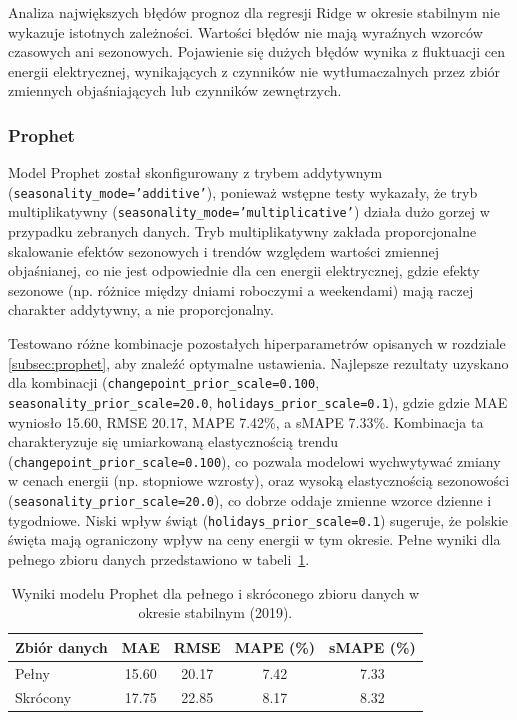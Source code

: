 Analiza największych błędów prognoz dla regresji Ridge w okresie stabilnym nie wykazuje istotnych zależności. Wartości błędów nie mają wyraźnych wzorców czasowych ani sezonowych. Pojawienie się dużych błędów wynika z fluktuacji cen energii elektrycznej, wynikających z czynników nie wytłumaczalnych przez zbiór zmiennych objaśniających lub czynników zewnętrzych.

\subsubsection{Prophet}
Model Prophet został skonfigurowany z trybem addytywnym (\texttt{seasonality\_mode='additive'}), ponieważ wstępne testy wykazały, że tryb multiplikatywny (\texttt{seasonality\_mode='multiplicative'}) działa dużo gorzej w przypadku zebranych danych. Tryb multiplikatywny zakłada proporcjonalne skalowanie efektów sezonowych i trendów względem wartości zmiennej objaśnianej, co nie jest odpowiednie dla cen energii elektrycznej, gdzie efekty sezonowe (np. różnice między dniami roboczymi a weekendami) mają raczej charakter addytywny, a nie proporcjonalny.

Testowano różne kombinacje pozostałych hiperparametrów opisanych w rozdziale \ref{subsec:prophet}, aby znaleźć optymalne ustawienia. Najlepsze rezultaty uzyskano dla kombinacji (\texttt{changepoint\_prior\_scale=0.100}, \texttt{seasonality\_prior\_scale=20.0}, \texttt{holidays\_prior\_scale=0.1}), gdzie gdzie MAE wyniosło 15.60, RMSE 20.17, MAPE 7.42\%, a sMAPE 7.33\%. Kombinacja ta charakteryzuje się umiarkowaną elastycznością trendu (\texttt{changepoint\_prior\_scale=0.100}), co pozwala modelowi wychwytywać zmiany w cenach energii (np. stopniowe wzrosty), oraz wysoką elastycznością sezonowości (\texttt{seasonality\_prior\_scale=20.0}), co dobrze oddaje zmienne wzorce dzienne i tygodniowe. Niski wpływ świąt (\texttt{holidays\_prior\_scale=0.1}) sugeruje, że polskie święta mają ograniczony wpływ na ceny energii w tym okresie. Pełne wyniki dla pełnego zbioru danych przedstawiono w tabeli~\ref{tab:prophet_results_combined_stable}.

\begin{table}[H]
    \centering
    \caption{Wyniki modelu Prophet dla pełnego i skróconego zbioru danych w okresie stabilnym (2019).}
    \label{tab:prophet_results_combined_stable}
    \begin{tabular}{|l|cccc|}
        \hline
        \textbf{Zbiór danych} & \textbf{MAE} & \textbf{RMSE} & \textbf{MAPE (\%)} & \textbf{sMAPE (\%)} \\
        \hline
        Pełny     & 15.60 & 20.17 & 7.42 & 7.33 \\
        Skrócony  & 17.75 & 22.85 & 8.17 & 8.32 \\
        \hline
    \end{tabular}
\end{table}

